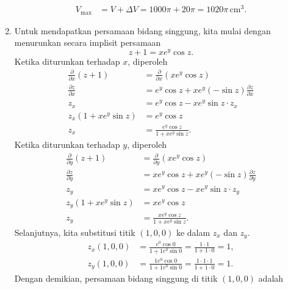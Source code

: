 \documentclass[11pt,a4paper]{article}
\begin{document}
\begin{enumerate}
\begin{align*}
          V_{\max} & = V + \Delta V = 1000\pi + 20\pi = 1020\pi\,\text{cm}^3.
        \end{align*}
  \item Untuk mendapatkan persamaan bidang singgung, kita mulai dengan menurunkan secara implisit persamaan
        \[
          z + 1 = x e^{y} \cos z.
        \]
        Ketika diturunkan terhadap $x$, diperoleh
        \begin{align*}
          \frac{\partial}{\partial x}(z + 1) & = \frac{\partial}{\partial x}(x e^{y} \cos z)                    \\
          \frac{\partial z}{\partial x}      & = e^{y} \cos z + x e^{y} (-\sin z) \frac{\partial z}{\partial x} \\
          z_x                                & = e^{y} \cos z - x e^{y} \sin z \cdot z_x                        \\
          z_x (1 + x e^{y} \sin z)           & = e^{y} \cos z                                                   \\
          z_x                                & = \frac{e^{y} \cos z}{1 + x e^{y} \sin z}.
        \end{align*}
        Ketika diturunkan terhadap $y$, diperoleh
        \begin{align*}
          \frac{\partial}{\partial y}(z + 1) & = \frac{\partial}{\partial y}(x e^{y} \cos z)                      \\
          \frac{\partial z}{\partial y}      & = x e^{y} \cos z + x e^{y} (-\sin z) \frac{\partial z}{\partial y} \\
          z_y                                & = x e^{y} \cos z - x e^{y} \sin z \cdot z_y                        \\
          z_y (1 + x e^{y} \sin z)           & = x e^{y} \cos z                                                   \\
          z_y                                & = \frac{x e^{y} \cos z}{1 + x e^{y} \sin z}.
        \end{align*}
        Selanjutnya, kita substitusi titik $(1, 0, 0)$ ke dalam $z_x$ dan $z_y$.
        \begin{align*}
          z_x(1, 0, 0) & = \frac{e^0 \cos 0}{1 + 1 e^0 \sin 0} = \frac{1 \cdot 1}{1 + 1 \cdot 0} = 1,           \\
          z_y(1, 0, 0) & = \frac{1 e^0 \cos 0}{1 + 1 e^0 \sin 0} = \frac{1 \cdot 1 \cdot 1}{1 + 1 \cdot 0} = 1.
        \end{align*}
        Dengan demikian, persamaan bidang singgung di titik $(1, 0, 0)$ adalah

\end{enumerate}
\end{document}
